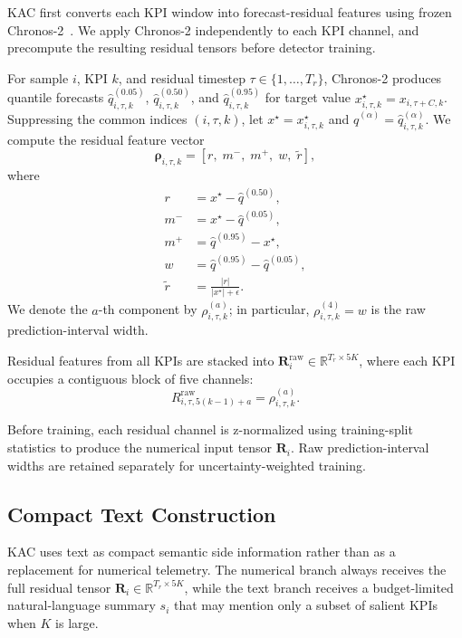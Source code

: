 \documentclass[conference]{IEEEtran}
\begin{document}
KAC first converts each KPI window into forecast-residual features using frozen Chronos-2~\cite{ansari2025chronos2}. We apply Chronos-2 independently to each KPI channel, and precompute the resulting residual tensors before detector training.

For sample $i$, KPI $k$, and residual timestep $\tau \in \{1,\ldots,T_r\}$, Chronos-2 produces quantile forecasts
$\hat{q}^{(0.05)}_{i,\tau,k}$,
$\hat{q}^{(0.50)}_{i,\tau,k}$, and
$\hat{q}^{(0.95)}_{i,\tau,k}$
for target value $x^{\star}_{i,\tau,k}=x_{i,\tau+C,k}$.
Suppressing the common indices $(i,\tau,k)$, let
$x^\star=x^\star_{i,\tau,k}$ and
$\hat{q}^{(\alpha)}=\hat{q}^{(\alpha)}_{i,\tau,k}$.
We compute the residual feature vector
\begin{equation}
\boldsymbol{\rho}_{i,\tau,k}
=
[r,\; m^{-},\; m^{+},\; w,\; \tilde{r}],
\end{equation}
where
\begin{equation}
\begin{aligned}
r &= x^\star-\hat{q}^{(0.50)},\\
m^{-} &= x^\star-\hat{q}^{(0.05)},\\
m^{+} &= \hat{q}^{(0.95)}-x^\star,\\
w &= \hat{q}^{(0.95)}-\hat{q}^{(0.05)},\\
\tilde{r} &= \frac{|r|}{|x^\star|+\epsilon}.
\end{aligned}
\end{equation}
We denote the $a$-th component by $\rho^{(a)}_{i,\tau,k}$; in particular, $\rho^{(4)}_{i,\tau,k}=w$ is the raw prediction-interval width.

Residual features from all KPIs are stacked into $\mathbf{R}^{\mathrm{raw}}_i \in \mathbb{R}^{T_r \times 5K}$, where each KPI occupies a contiguous block of five channels:
\begin{equation}
R^{\mathrm{raw}}_{i,\tau,5(k-1)+a}
=
\rho^{(a)}_{i,\tau,k}.
\end{equation}

Before training, each residual channel is z-normalized using training-split statistics to produce the numerical input tensor $\mathbf{R}_i$. Raw prediction-interval widths are retained separately for uncertainty-weighted training.

\subsection{Compact Text Construction}
\label{sec:text_construction}

KAC uses text as compact semantic side information rather than as a replacement for numerical telemetry.
The numerical branch always receives the full residual tensor $\mathbf{R}_i \in \mathbb{R}^{T_r \times 5K}$, while the text branch receives a budget-limited natural-language summary $s_i$ that may mention only a subset of salient KPIs when $K$ is large.
\end{document}
